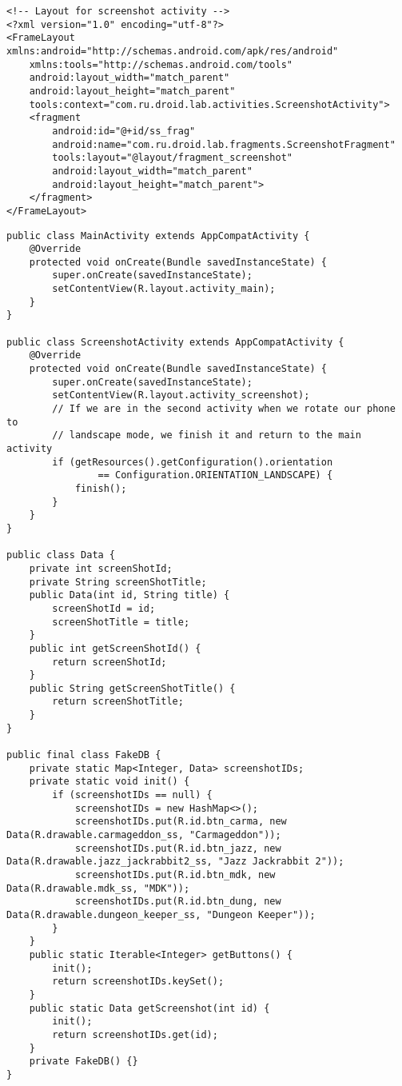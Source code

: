 \begin{lstlisting}[style=A_XML, caption={XML for fragment example}, label={listing:fragxml}]
<!-- Layout for screenshot activity -->
<?xml version="1.0" encoding="utf-8"?>
<FrameLayout xmlns:android="http://schemas.android.com/apk/res/android"
    xmlns:tools="http://schemas.android.com/tools"
    android:layout_width="match_parent"
    android:layout_height="match_parent"
    tools:context="com.ru.droid.lab.activities.ScreenshotActivity">
    <fragment
        android:id="@+id/ss_frag"
        android:name="com.ru.droid.lab.fragments.ScreenshotFragment"
        tools:layout="@layout/fragment_screenshot"
        android:layout_width="match_parent"
        android:layout_height="match_parent">
    </fragment>
</FrameLayout>
\end{lstlisting}

\begin{lstlisting}[style=A_Java, caption={Java for fragment example}, label={listing:javaxml}]
public class MainActivity extends AppCompatActivity {
    @Override
    protected void onCreate(Bundle savedInstanceState) {
        super.onCreate(savedInstanceState);
        setContentView(R.layout.activity_main);
    }
}

public class ScreenshotActivity extends AppCompatActivity {
    @Override
    protected void onCreate(Bundle savedInstanceState) {
        super.onCreate(savedInstanceState);
        setContentView(R.layout.activity_screenshot);
        // If we are in the second activity when we rotate our phone to
        // landscape mode, we finish it and return to the main activity
        if (getResources().getConfiguration().orientation
                == Configuration.ORIENTATION_LANDSCAPE) {
            finish();
        }
    }
}

public class Data {
    private int screenShotId;
    private String screenShotTitle;
    public Data(int id, String title) {
        screenShotId = id;
        screenShotTitle = title;
    }
    public int getScreenShotId() {
        return screenShotId;
    }
    public String getScreenShotTitle() {
        return screenShotTitle;
    }
}

public final class FakeDB {
    private static Map<Integer, Data> screenshotIDs;
    private static void init() {
        if (screenshotIDs == null) {
            screenshotIDs = new HashMap<>();
            screenshotIDs.put(R.id.btn_carma, new Data(R.drawable.carmageddon_ss, "Carmageddon"));
            screenshotIDs.put(R.id.btn_jazz, new Data(R.drawable.jazz_jackrabbit2_ss, "Jazz Jackrabbit 2"));
            screenshotIDs.put(R.id.btn_mdk, new Data(R.drawable.mdk_ss, "MDK"));
            screenshotIDs.put(R.id.btn_dung, new Data(R.drawable.dungeon_keeper_ss, "Dungeon Keeper"));
        }
    }
    public static Iterable<Integer> getButtons() {
        init();
        return screenshotIDs.keySet();
    }
    public static Data getScreenshot(int id) {
        init();
        return screenshotIDs.get(id);
    }
    private FakeDB() {}
}


\end{lstlisting}
